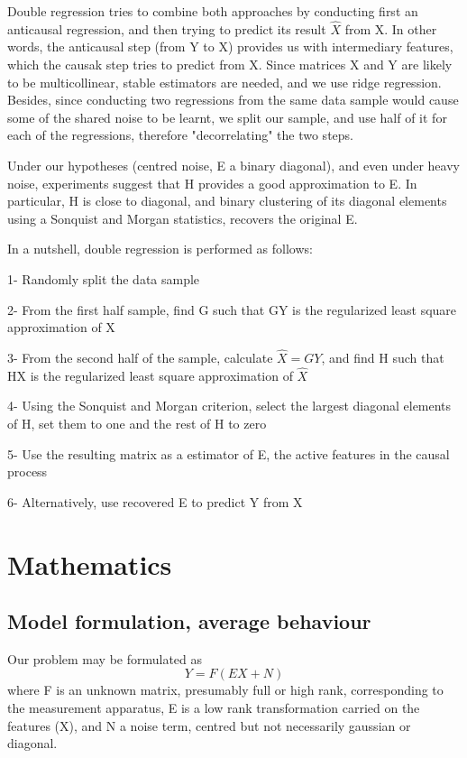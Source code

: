 \documentclass{article}
\begin{document}
Double regression tries to combine both approaches by conducting first an anticausal regression, and then trying to predict its result $\hat X$ from X. In other words, the anticausal step (from Y to X) provides us with intermediary features, which the causak step tries to predict from X. Since matrices X and Y are likely to be multicollinear, stable estimators are needed, and we use ridge regression. Besides, since conducting two regressions from the same data sample would cause some of the shared noise to be learnt, we split our sample, and use half of it for each of the regressions, therefore "decorrelating" the two steps.

Under our hypotheses (centred noise, E a binary diagonal), and even under heavy noise, experiments suggest that H provides a good approximation to E. In particular, H is close to diagonal, and binary clustering of its diagonal elements using a Sonquist and Morgan statistics, recovers the original E. 

In a nutshell, double regression is performed as follows:
	
	1- Randomly split the data sample
	
	2- From the first half sample, find G such that GY is the regularized least square approximation of X
	
	3- From the second half of the sample, calculate $\hat X=GY$, and find H such that HX is the regularized least square approximation of $\hat X$
	
	4- Using the Sonquist and Morgan criterion, select the largest diagonal elements of H, set them to one and the rest of H to zero
	
	5- Use the resulting matrix as a estimator of E, the active features in the causal process

	6- Alternatively, use recovered E to predict Y from X 


\section{Mathematics}

\subsection{Model formulation, average behaviour}

Our problem may be formulated as
\begin{equation}
    Y = F(EX + N)
    \label{eq:model}
\end{equation}
where F is an unknown matrix, presumably full or high rank, corresponding to the measurement apparatus, E is a low rank transformation carried on the features (X), and N a noise term, centred but not necessarily gaussian or diagonal.
\end{document}
